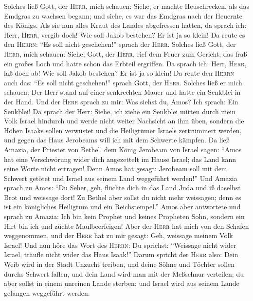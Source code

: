  Solches ließ Gott, der \textsc{Herr}, mich schauen:
Siehe, er machte Heuschrecken, als das Emdgras zu wachsen begann; und
siehe, es war das Emdgras nach der Heuernte des Königs. 
Als sie nun alles Kraut des Landes abgefressen hatten, da sprach ich:
Herr, \textsc{Herr}, vergib doch! Wie soll Jakob bestehen? Er ist ja so
klein!  Da reute es den \textsc{Herrn}: ``Es soll nicht
geschehen!'' sprach der \textsc{Herr}.  Solches ließ Gott,
der \textsc{Herr}, mich schauen: Siehe, Gott, der \textsc{Herr}, rief
dem Feuer zum Gericht; das fraß ein großes Loch und hatte schon das
Erbteil ergriffen.  Da sprach ich: Herr, \textsc{Herr},
laß doch ab! Wie soll Jakob bestehen? Er ist ja so klein! 
Da reute den \textsc{Herrn} auch das: ``Es soll nicht geschehen!''
sprach Gott, der \textsc{Herr}.  Solches ließ er mich
schauen: Der Herr stand auf einer senkrechten Mauer und hatte ein
Senkblei in der Hand.  Und der \textsc{Herr} sprach zu
mir: Was siehst du, Amos? Ich sprach: Ein Senkblei! Da sprach der Herr:
Siehe, ich ziehe ein Senkblei mitten durch mein Volk Israel hindurch und
werde nicht weiter Nachsicht an ihm üben,  sondern die
Höhen Isaaks sollen verwüstet und die Heiligtümer Israels zertrümmert
werden, und gegen das Haus Jerobeams will ich mit dem Schwerte kämpfen.
 Da ließ Amazia, der Priester von Bethel, dem König
Jerobeam von Israel sagen: ``Amos hat eine Verschwörung wider dich
angezettelt im Hause Israel; das Land kann seine Worte nicht ertragen!
 Denn Amos hat gesagt: Jerobeam soll mit dem Schwert
getötet und Israel aus seinem Land weggeführt werden!'' 
Und Amazia sprach zu Amos: ``Du Seher, geh, flüchte dich in das Land
Juda und iß daselbst Brot und weissage dort!  Zu Bethel
aber sollst du nicht mehr weissagen; denn es ist ein königliches
Heiligtum und ein Reichstempel.''  Amos aber antwortete
und sprach zu Amazia: Ich bin kein Prophet und keines Propheten Sohn,
sondern ein Hirt bin ich und züchte Maulbeerfeigen!  Aber
der \textsc{Herr} hat mich von den Schafen weggenommen, und der
\textsc{Herr} hat zu mir gesagt: Geh, weissage meinem Volk Israel!
 Und nun höre das Wort des \textsc{Herrn}: Du sprichst:
``Weissage nicht wider Israel, träufle nicht wider das Haus Isaak!''
 Darum spricht der \textsc{Herr} also: Dein Weib wird in
der Stadt Unzucht treiben, und deine Söhne und Töchter sollen durchs
Schwert fallen, und dein Land wird man mit der Meßschnur verteilen; du
aber sollst in einem unreinen Lande sterben; und Israel wird aus seinem
Lande gefangen weggeführt werden.


